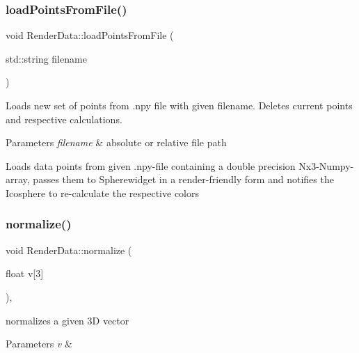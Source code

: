 \mbox{\label{class_render_data_ac161f29f7d6ae6fd3912e8af7bdccdfd}} 
\subsubsection{\texorpdfstring{load\+Points\+From\+File()}{loadPointsFromFile()}}
{\footnotesize\ttfamily void Render\+Data\+::load\+Points\+From\+File (\begin{DoxyParamCaption}\item[{std\+::string}]{filename }\end{DoxyParamCaption})}

Loads new set of points from .npy file with given filename. Deletes current points and respective calculations. 
\begin{DoxyParams}{Parameters}
{\em filename} & absolute or relative file path\\
\hline
\end{DoxyParams}
Loads data points from given .npy-\/file containing a double precision Nx3-\/\+Numpy-\/array, passes them to Spherewidget in a render-\/friendly form and notifies the Icosphere to re-\/calculate the respective colors \mbox{\label{class_render_data_ad8c590fd11eda06875112a74d318267f}} 
\subsubsection{\texorpdfstring{normalize()}{normalize()}}
{\footnotesize\ttfamily void Render\+Data\+::normalize (\begin{DoxyParamCaption}\item[{float}]{v\mbox{[}3\mbox{]} }\end{DoxyParamCaption})\hspace{0.3cm}{\ttfamily [inline]}, {\ttfamily [private]}}

normalizes a given 3D vector 
\begin{DoxyParams}{Parameters}
{\em v} & \\
\hline
\end{DoxyParams}
\mbox{\label{class_render_data_a7b32e615d46ac5ffbd3d14de0da2c406}} 
